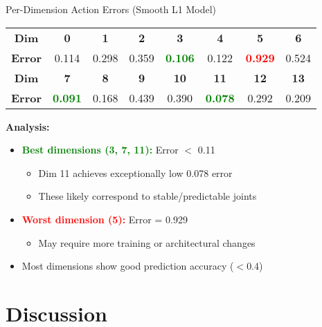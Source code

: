 \documentclass[aspectratio=169]{beamer}
\begin{document}
\begin{frame}{Per-Dimension Action Errors (Smooth L1 Model)}
\begin{table}
\centering
\small
\begin{tabular}{cccccccc}
\toprule
\textbf{Dim} & \textbf{0} & \textbf{1} & \textbf{2} & \textbf{3} & \textbf{4} & \textbf{5} & \textbf{6} \\
\textbf{Error} & 0.114 & 0.298 & 0.359 & \textcolor{green}{\textbf{0.106}} & 0.122 & \textcolor{red}{\textbf{0.929}} & 0.524 \\
\midrule
\textbf{Dim} & \textbf{7} & \textbf{8} & \textbf{9} & \textbf{10} & \textbf{11} & \textbf{12} & \textbf{13} \\
\textbf{Error} & \textcolor{green}{\textbf{0.091}} & 0.168 & 0.439 & 0.390 & \textcolor{green}{\textbf{0.078}} & 0.292 & 0.209 \\
\bottomrule
\end{tabular}
\end{table}

\vspace{0.5cm}
\textbf{Analysis:}
\begin{itemize}
    \item \textcolor{green}{\textbf{Best dimensions (3, 7, 11):}} Error $<$ 0.11
    \begin{itemize}
        \item Dim 11 achieves exceptionally low 0.078 error
        \item These likely correspond to stable/predictable joints
    \end{itemize}
    \item \textcolor{red}{\textbf{Worst dimension (5):}} Error = 0.929
    \begin{itemize}
        \item May require more training or architectural changes
    \end{itemize}
    \item Most dimensions show good prediction accuracy ($< $0.4)
\end{itemize}
\end{frame}

\section{Discussion}
\end{document}
